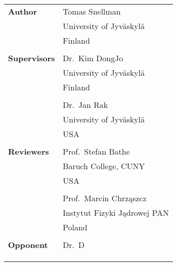 \begin{table}[h!]
  \begin{tabular}{ p{4cm}  p{6cm} }
  {\bf Author} 	& {Tomas Snellman}\\  
  {} 			& {University of Jyv\"askyl\"a}\\  
  {} 			& {Finland}\\  
  {} 			& {}\\  

  {\bf Supervisors} 	& {Dr.~Kim DongJo}\\  
  {} 				& {University of Jyv\"askyl\"a}\\  
  {} 				& {Finland}\\  
  {} 				& {}\\  

  {}			 	& {Dr.~Jan Rak}\\  
  {} 				& {University of Jyv\"askyl\"a}\\  
  {} 				& {USA}\\  
  {} 				& {}\\  

  {\bf Reviewers} 	& {Prof.~Stefan Bathe}\\  
  {} 				& {Baruch College, CUNY}\\  
  {} 				& {USA}\\  
  {} 				& {}\\  

  {}			 	& {Prof.~Marcin Chrząszcz}\\  
  {} 				& {Instytut Fizyki Jądrowej PAN}\\  
  {} 				& {Poland}\\  
  {} 				& {}\\  
    
  {\bf Opponent} 	& {Dr.~D}\\  
  {} 				& {}\\  
  {} 				& {}\\  
  {} 				& {}\\  

  \end{tabular}
  \label{}
\end{table}
\pagebreak

\vspace*{10mm} 
\thispagestyle{empty}
\begin{flushright}
\end{flushright}
\pagebreak
\thispagestyle{empty}
\mbox{} 
\pagebreak
\setcounter{page}{0}

